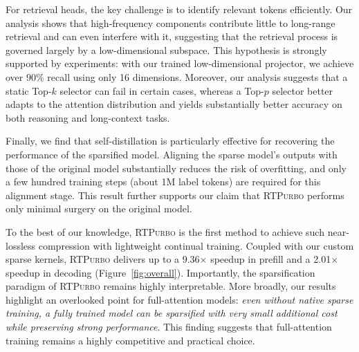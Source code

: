 \documentclass{llmxive}
\providecommand{\name}{{\textsc{RTPurbo}}\xspace}
\providecommand{\yy}[1]{\textbf{[YY: #1]}}
\begin{document}
For retrieval heads, the key challenge is to identify relevant tokens efficiently. Our analysis shows that high-frequency components contribute little to long-range retrieval and can even interfere with it, suggesting that the retrieval process is governed largely by a low-dimensional subspace. This hypothesis is strongly supported by experiments: with our trained low-dimensional projector, we achieve over $90\%$ recall using only 16 dimensions. Moreover, our analysis suggests that a static Top-$k$ selector can fail in certain cases, whereas a Top-$p$ selector better adapts to the attention distribution and yields substantially better accuracy on both reasoning and long-context tasks.

Finally, we find that self-distillation is particularly effective for recovering the performance of the sparsified model. Aligning the sparse model's outputs with those of the original model substantially reduces the risk of overfitting, and only a few hundred training steps (about 1M label tokens) are required for this alignment stage. This result further supports our claim that \name performs only minimal surgery on the original model.

To the best of our knowledge, \name is the first method to achieve such near-lossless compression with lightweight continual training. Coupled with our custom sparse kernels, \name delivers up to a 9.36$\times$ speedup in prefill and a 2.01$\times$ speedup in decoding (Figure~\ref{fig:overall}). Importantly, the sparsification paradigm of \name remains highly interpretable. More broadly, our results highlight an overlooked point for full-attention models: \textit{even without native sparse training, a fully trained model can be sparsified with very small additional cost while preserving strong performance}. This finding suggests that full-attention training remains a highly competitive and practical choice.


\end{document}
